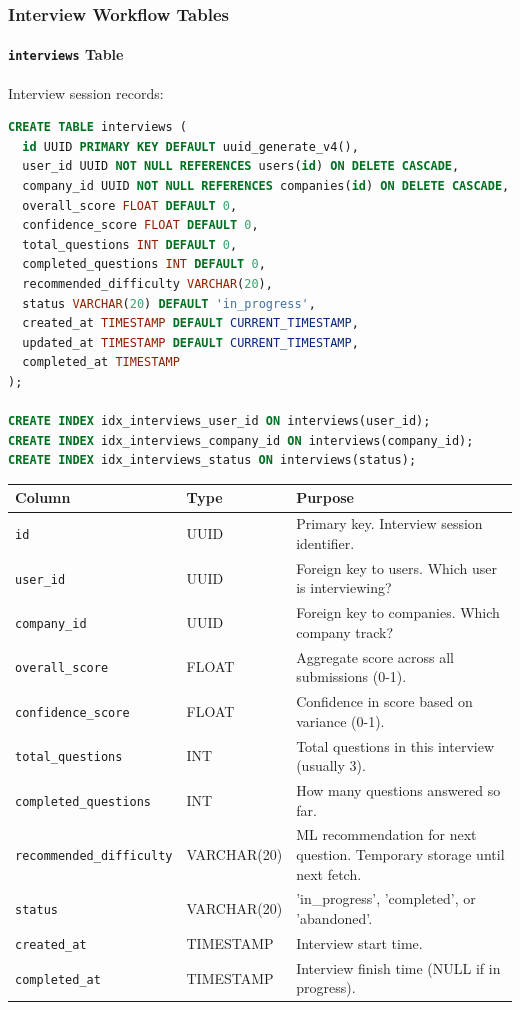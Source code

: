 \documentclass[12pt,a4paper,oneside]{article}
\newcommand{\varname}[1]{\texttt{#1}}
\newcommand{\database}[1]{\texttt{#1}}
\begin{document}
\subsubsection{Interview Workflow Tables}

\paragraph{\database{interviews} Table}

Interview session records:

\begin{lstlisting}[language=SQL, caption=Interviews Table Schema]
CREATE TABLE interviews (
  id UUID PRIMARY KEY DEFAULT uuid_generate_v4(),
  user_id UUID NOT NULL REFERENCES users(id) ON DELETE CASCADE,
  company_id UUID NOT NULL REFERENCES companies(id) ON DELETE CASCADE,
  overall_score FLOAT DEFAULT 0,
  confidence_score FLOAT DEFAULT 0,
  total_questions INT DEFAULT 0,
  completed_questions INT DEFAULT 0,
  recommended_difficulty VARCHAR(20),
  status VARCHAR(20) DEFAULT 'in_progress',
  created_at TIMESTAMP DEFAULT CURRENT_TIMESTAMP,
  updated_at TIMESTAMP DEFAULT CURRENT_TIMESTAMP,
  completed_at TIMESTAMP
);

CREATE INDEX idx_interviews_user_id ON interviews(user_id);
CREATE INDEX idx_interviews_company_id ON interviews(company_id);
CREATE INDEX idx_interviews_status ON interviews(status);
\end{lstlisting}

\begin{table}[H]
\centering
\small
\begin{tabular}{|p{2.3cm}|p{1.8cm}|p{9.9cm}|}
\hline
\textbf{Column} & \textbf{Type} & \textbf{Purpose} \\
\hline
\varname{id} & UUID & Primary key. Interview session identifier. \\
\hline
\varname{user\_id} & UUID & Foreign key to users. Which user is interviewing? \\
\hline
\varname{company\_id} & UUID & Foreign key to companies. Which company track? \\
\hline
\varname{overall\_score} & FLOAT & Aggregate score across all submissions (0-1). \\
\hline
\varname{confidence\_score} & FLOAT & Confidence in score based on variance (0-1). \\
\hline
\varname{total\_questions} & INT & Total questions in this interview (usually 3). \\
\hline
\varname{completed\_questions} & INT & How many questions answered so far. \\
\hline
\varname{recommended\_difficulty} & VARCHAR(20) & ML recommendation for next question. Temporary storage until next fetch. \\
\hline
\varname{status} & VARCHAR(20) & 'in\_progress', 'completed', or 'abandoned'. \\
\hline
\varname{created\_at} & TIMESTAMP & Interview start time. \\
\hline
\varname{completed\_at} & TIMESTAMP & Interview finish time (NULL if in progress). \\
\hline
\end{tabular}
\end{table}
\end{document}
